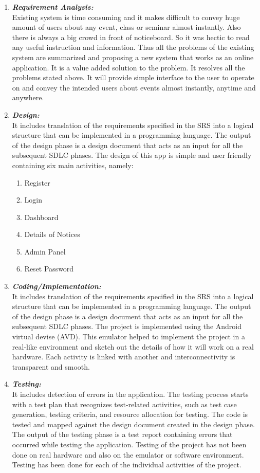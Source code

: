\begin{enumerate}
\item \textbf{\emph{Requirement Analysis:}}\\
Existing system is time consuming and it makes difficult to convey huge amount of users about
any event, class or seminar almost instantly. Also there is always a big crowd in front of
noticeboard. So it was hectic to read any useful instruction and information. Thus all the
problems of the existing system are summarized and proposing a new system that works as an
online application. It is a value added solution to the problem. It resolves all the problems stated
above. It will provide simple interface to the user to operate on and convey the intended users
about events almost instantly, anytime and anywhere.
\item \textbf{\emph{Design:}}\\
It includes translation of the requirements specified in the SRS into a logical structure that can be implemented in a programming language. The output of the design phase is a design document that acts as an input for all the subsequent SDLC phases. The design of this app is simple and user friendly containing six main activities, namely:
\begin{enumerate}
\item Register 
\item Login
\item Dashboard
\item Details of Notices
\item Admin Panel 
\item Reset Password
\end{enumerate}

\item \textbf{\emph{Coding/Implementation:}}\\
It includes translation of the requirements specified in the SRS into a logical structure that can be implemented in a programming language. The output of the design phase is a design document that acts as an input for all the subsequent SDLC phases. The project is implemented using the Android virtual devise (AVD). This emulator helped to implement the project in a real-like environment and sketch out the details of how it will work on a real hardware. Each activity is linked with another and interconnectivity is transparent and smooth.

\item \textbf{\emph{Testing:}}\\
It includes detection of errors in the application. The testing process starts with a test plan that recognizes test-related activities, such as test case generation, testing criteria, and resource allocation for testing. The code is tested and mapped against the design document created in the design phase. The output of the testing phase is a test report containing errors that occurred while testing the application. Testing of the project has not been done on  real hardware and also on the emulator or software environment. Testing has been done for each of the individual activities of the project.


\end{enumerate}
